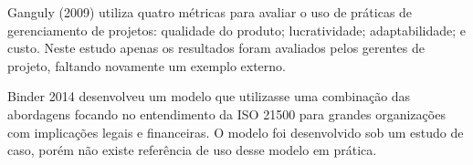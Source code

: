 Ganguly (2009) utiliza quatro métricas para avaliar o uso de práticas de gerenciamento de projetos: qualidade do produto; lucratividade; adaptabilidade; e custo. Neste estudo apenas os resultados foram avaliados pelos gerentes de projeto, faltando novamente um exemplo externo.

Binder 2014 desenvolveu um modelo que utilizasse uma combinação das abordagens focando no entendimento da ISO 21500 para grandes organizações com implicações legais e financeiras. O modelo foi desenvolvido sob um estudo de caso, porém não existe referência de uso desse modelo em prática.

